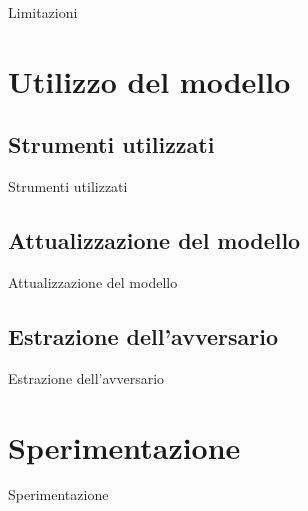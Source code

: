 \documentclass[9pt]{beamer}
\begin{document}
            \begin{frame}{Limitazioni}
            \end{frame}
    
    \section{Utilizzo del modello}
    
        \subsection{Strumenti utilizzati}
            \begin{frame}{Strumenti utilizzati}
            \end{frame}
    
        \subsection{Attualizzazione del modello}
            \begin{frame}{Attualizzazione del modello}
            \end{frame}
            
        \subsection{Estrazione dell'avversario}
            \begin{frame}{Estrazione dell'avversario}
            \end{frame}
            
    \section{Sperimentazione}
    
        \begin{frame}{Sperimentazione}
        \end{frame}
\end{document}

